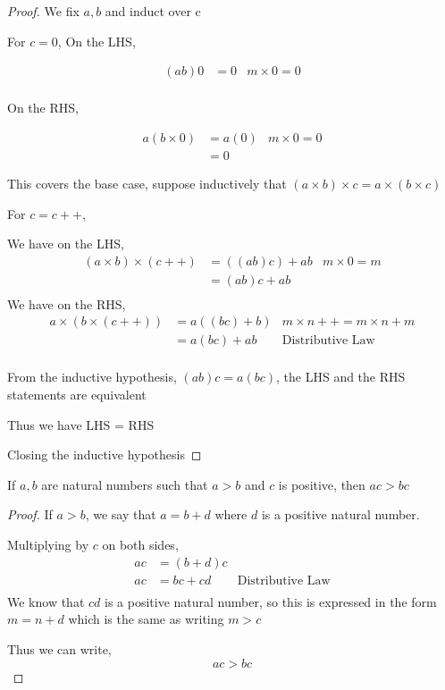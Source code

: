 \documentclass[11pt]{report}
\begin{document}
\begin{proof}
	We fix $a,b$ and induct over c

	For $c=0$,
	On the LHS,

	\begin{align*}
		(ab)0 & = 0 & m \times 0 = 0 \\
	\end{align*}

	On the RHS,

	\begin{align*}
		a(b \times 0) & = a(0) & m \times 0 = 0 \\
		              & = 0
	\end{align*}

	This covers the base case, suppose inductively that $(a \times b) \times c = a \times (b \times c)$

	For $c = c++$,

	We have on the LHS,
	\begin{align*}
		(a \times b) \times (c++) & = ((ab)c) + ab & m \times 0 = m \\
		                          & = (ab)c + ab                    \\
	\end{align*}
	We have on the RHS,
	\begin{align*}
		a \times (b \times (c++)) & = a((bc) + b) & m \times n++  = m \times n + m \\
		                          & = a(bc) + ab  & \text{Distributive Law}        \\
	\end{align*}

	From the inductive hypothesis, $(ab)c = a(bc)$, the LHS and the RHS statements
	are equivalent

	Thus we have LHS = RHS

	Closing the inductive hypothesis
\end{proof}
\begin{prop}
	If $a,b$ are natural numbers such that $a>b$ and $c$ is positive, then $ac > bc$
\end{prop}
\begin{proof}
	If $a > b$, we say that $a = b+d$ where $d$ is a positive natural number.

	Multiplying by $c$ on both sides,
	\begin{align*}
		ac & = (b+d)c  &                         \\
		ac & = bc + cd & \text{Distributive Law} \\
	\end{align*}
	We know that $cd$ is a positive natural number, so this is expressed in the form $m = n + d$ which is the same as writing $m > c$

	Thus we can write,
	\[
		ac > bc
	\]
\end{proof}
\end{document}
